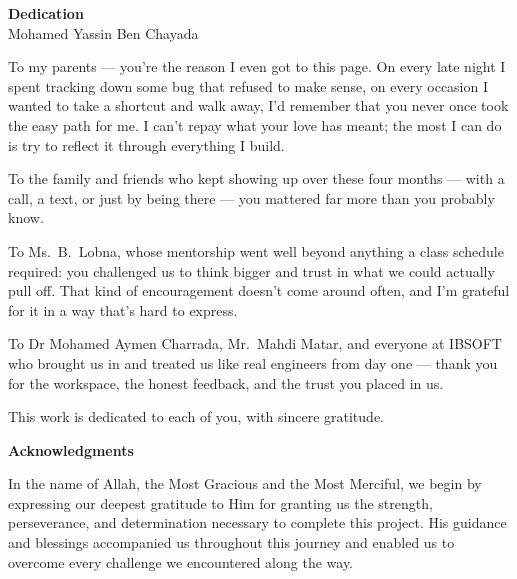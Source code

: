 \documentclass[12pt,a4paper,oneside]{report}
\begin{document}
\newpage\thispagestyle{empty}
\begin{center}
\vspace*{2cm}
{\Large\bfseries Dedication}\\[0.3cm]
{\normalsize Mohamed Yassin Ben Chayada}\\[1.5cm]
\end{center}
{
\hspace{0.8cm}To my parents — you're the reason I even got to this page. On every late night I spent tracking down some bug that refused to make sense, on every occasion I wanted to take a shortcut and walk away, I'd remember that you never once took the easy path for me. I can't repay what your love has meant; the most I can do is try to reflect it through everything I build.

\hspace{0.8cm}To the family and friends who kept showing up over these four months — with a call, a text, or just by being there — you mattered far more than you probably know.

\hspace{0.8cm}To Ms.\ B.\ Lobna, whose mentorship went well beyond anything a class schedule required: you challenged us to think bigger and trust in what we could actually pull off. That kind of encouragement doesn't come around often, and I'm grateful for it in a way that's hard to express.

\hspace{0.8cm}To Dr Mohamed Aymen Charrada, Mr.\ Mahdi Matar, and everyone at IBSOFT who brought us in and treated us like real engineers from day one — thank you for the workspace, the honest feedback, and the trust you placed in us.

\hspace{0.8cm}This work is dedicated to each of you, with sincere gratitude.
}

\newpage
\thispagestyle{empty}

\begin{center}
\vspace*{1.5cm}
{\Large\bfseries Acknowledgments}\\[1cm]
\end{center}

\hspace{0.8cm}In the name of Allah, the Most Gracious and the Most Merciful, we begin by expressing our deepest gratitude to Him for granting us the strength, perseverance, and determination necessary to complete this project. His guidance and blessings accompanied us throughout this journey and enabled us to overcome every challenge we encountered along the way.
\end{document}
